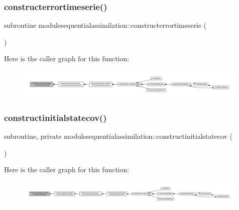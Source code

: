 \subsubsection{\texorpdfstring{constructerrortimeserie()}{constructerrortimeserie()}}
{\footnotesize\ttfamily subroutine modulesequentialassimilation\+::constructerrortimeserie (\begin{DoxyParamCaption}{ }\end{DoxyParamCaption})\hspace{0.3cm}{\ttfamily [private]}}

Here is the caller graph for this function\+:\nopagebreak
\begin{figure}[H]
\begin{center}
\leavevmode
\includegraphics[width=350pt]{namespacemodulesequentialassimilation_aeee40d5724f1d4056ec3c81965e2d7c8_icgraph}
\end{center}
\end{figure}
\mbox{\label{namespacemodulesequentialassimilation_ab636e048b1738282bf697c69d3e4fd10}} 
\subsubsection{\texorpdfstring{constructinitialstatecov()}{constructinitialstatecov()}}
{\footnotesize\ttfamily subroutine, private modulesequentialassimilation\+::constructinitialstatecov (\begin{DoxyParamCaption}{ }\end{DoxyParamCaption})\hspace{0.3cm}{\ttfamily [private]}}

Here is the caller graph for this function\+:\nopagebreak
\begin{figure}[H]
\begin{center}
\leavevmode
\includegraphics[width=350pt]{namespacemodulesequentialassimilation_ab636e048b1738282bf697c69d3e4fd10_icgraph}
\end{center}
\end{figure}
\mbox{\label{namespacemodulesequentialassimilation_a199d6fc518c2a4bb9604a7fdbf0ca4e6}} 
